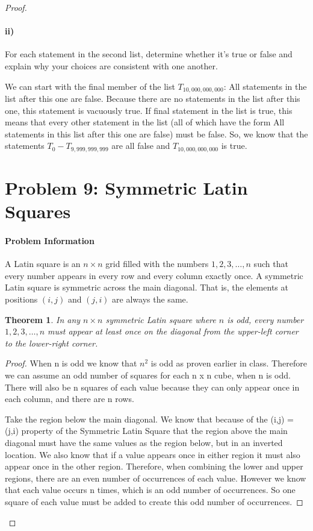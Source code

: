 \documentclass[10pt,letter]{article}
\newtheorem*{thm}{Theorem}
\begin{document}
\begin{proof}
\paragraph{ii)} For each statement in the second list, determine whether it's true or false and explain why your choices are consistent with one another.

We can start with the final member of the list $T_{10,000,000,000}$: All statements in the list after this one are false. Because there are no statements in the list after this one, this statement is vacuously true. If final statement in the list is true, this means that every other statement in the list (all of which have the form All statements in this list after this one are false) must be false. So, we know that the statements $T_0 - T_{9,999,999,999}$ are all false and $T_{10,000,000,000}$ is true.

\section*{Problem 9: Symmetric Latin Squares}
\paragraph{Problem Information}
A Latin square is an $n \times n$ grid filled with the numbers $1, 2, 3, \ldots, n$ such that every number appears in every row and every column exactly once. A symmetric Latin square is symmetric across the main diagonal. That is, the elements at positions $(i, j)$ and $(j, i)$ are always the same.

\begin{thm}In any $n \times n$ symmetric Latin square where $n$ is odd, every number $1, 2, 3, \ldots, n$ must appear at least once on the diagonal from the upper-left corner to the lower-right corner.\end{thm}

\begin{proof}
When n is odd we know that $ n^2 $ is odd as proven earlier in class. Therefore we can assume an odd number of squares for each n x n cube, when n is odd. There will also be n squares of each value because they can only appear once in each column, and there are n rows. 

Take the region below the main diagonal. We know that because of the (i,j) = (j,i) property of the Symmetric Latin Square that the region above the main diagonal must have the same values as the region below, but in an inverted location. We also know that if a value appears once in either region it must also appear once in the other region. Therefore, when combining the lower and upper regions, there are an even number of occurrences of each value. However we know that each value occurs n times, which is an odd number of occurrences. So one square of each value must be added to create this odd number of occurrences.  


\end{proof}
\end{proof}
\end{document}
